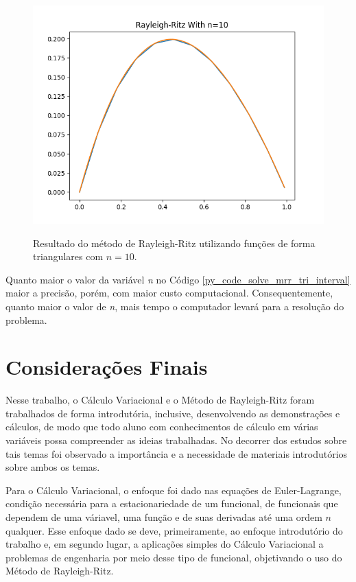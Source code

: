 \documentclass[
	12pt,				%
	openright,			%
    twoside,			%
	a4paper,			%
	english,			%
	french,				%
	spanish,			%
	brazil				%
	]{abntex2}
\numberwithin{lema}{chapter}
\numberwithin{teorema}{chapter}
\numberwithin{definicao}{chapter}
\numberwithin{exemplo}{chapter}
\numberwithin{figure}{chapter}
\begin{document}
\begin{figure}[b]
	\caption{Resultado do método de Rayleigh-Ritz utilizando funções de forma triangulares com $n=10$.}
	\centering
	\includegraphics[scale=0.8]{../figuras/code/code_plot_mrr_triangulate_n10.png}
	\label{fig:code_plot_mrr_triangulate_n10}
\end{figure}

Quanto maior o valor da variável \textit{n} no Código \ref{py_code_solve_mrr_tri_interval} maior a precisão, porém, com maior custo computacional. Consequentemente, quanto maior o valor de \textit{n}, mais tempo o computador levará para a resolução do problema.

\chapter*{Considerações Finais}

Nesse trabalho, o Cálculo Variacional e o Método de Rayleigh-Ritz foram trabalhados de forma introdutória, inclusive, desenvolvendo as demonstrações e cálculos, de modo que todo aluno com conhecimentos de cálculo em várias variáveis possa compreender as ideias trabalhadas. No decorrer dos estudos sobre tais temas foi observado a importância e a necessidade de materiais introdutórios sobre ambos os temas.

Para o Cálculo Variacional, o enfoque foi dado nas equações de Euler-Lagrange, condição necessária para a estacionariedade de um funcional, de funcionais que dependem de uma váriavel, uma função e de suas derivadas até uma ordem $n$ qualquer. Esse enfoque dado se deve, primeiramente, ao enfoque introdutório do trabalho e, em segundo lugar, a aplicações simples do Cálculo Variacional a problemas de engenharia por meio desse tipo de funcional, objetivando o uso do Método de Rayleigh-Ritz.
\end{document}
